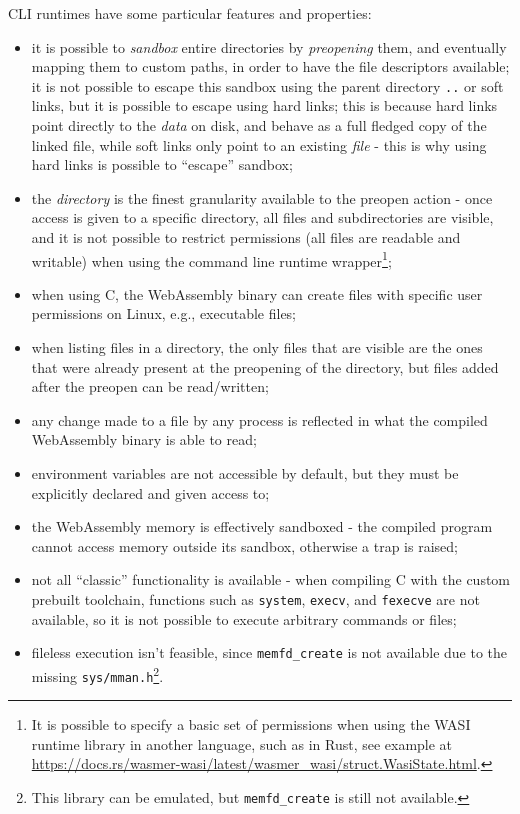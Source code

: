CLI runtimes have some particular features and properties:
\begin{itemize}
  \item it is possible to \textit{sandbox} entire directories by \textit{preopening} them, and eventually mapping them to custom paths,
        in order to have the file descriptors available; it is not possible to escape this sandbox using the parent directory \texttt{..}
        or soft links, but it is possible to escape using hard links;
        this is because hard links point directly to the \textit{data} on disk, and behave as a full fledged copy of the linked file, while soft links
        only point to an existing \textit{file} - this is why using hard links is possible to ``escape'' sandbox;
  \item the \textit{directory} is the finest granularity available to the preopen action - once access is given to a specific directory, all files and subdirectories are
        visible, and it is not possible to restrict permissions (all files are readable and
        writable) when using the command line runtime wrapper\footnote{It is possible to specify a basic set of permissions when using the WASI runtime library in another language, such as in Rust,
        see example at \url{https://docs.rs/wasmer-wasi/latest/wasmer_wasi/struct.WasiState.html}.};
  \item when using C, the WebAssembly binary can create files with specific user permissions on Linux, e.g., executable files;
  \item when listing files in a directory, the only files that are visible are the ones that were already present at the preopening of the directory,
        but files added after the preopen can be read/written;
  \item any change made to a file by any process is reflected in what the compiled WebAssembly binary is able to read;
  \item environment variables are not accessible by default, but they must be explicitly declared and given access to;
  \item the WebAssembly memory is effectively sandboxed - the compiled program cannot access memory outside its sandbox, otherwise a trap is raised;
  \item not all ``classic'' functionality is available - when compiling C with the custom prebuilt toolchain,
        functions such as \texttt{system}, \texttt{execv}, and \texttt{fexecve} are not available,
        so it is not possible to execute arbitrary commands or files;
  \item fileless execution isn't feasible, since \texttt{memfd\_create} is not available due to the missing
        \texttt{sys/mman.h}\footnote{This library can be emulated, but \texttt{memfd\_create} is still not available.}.
\end{itemize}

